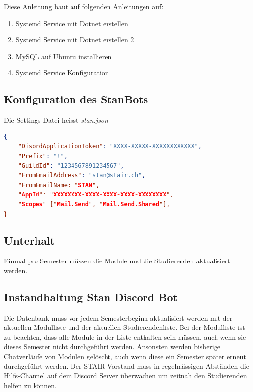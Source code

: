 \documentclass[a4paper, table]{article}
\begin{document}
Diese Anleitung baut auf folgenden Anleitungen auf:
\begin{enumerate}
    \item \href{https://devblogs.microsoft.com/dotnet/net-core-and-systemd/}{Systemd Service mit Dotnet erstellen}
    \item \href{https://blog.maartenballiauw.be/post/2021/05/25/running-a-net-application-as-a-service-on-linux-with-systemd.html}{Systemd Service mit Dotnet erstellen 2}
    \item \href{https://www.digitalocean.com/community/tutorials/how-to-install-mysql-on-ubuntu-20-04}{MySQL auf Ubuntu installieren}
    \item \href{https://askubuntu.com/questions/1004853/systemd-is-hanging-when-i-start-or-restart-a-service}{Systemd Service Konfiguration}
\end{enumerate}

\subsection{Konfiguration des StanBots}\label{konfigurationStanBot}

Die Settings Datei heisst \textit{stan.json}
\begin{lstlisting}[language=json]
{
    "DisordApplicationToken": "XXXX-XXXXX-XXXXXXXXXXXX",
    "Prefix": "!",
    "GuildId": "1234567891234567",
    "FromEmailAddress": "stan@stair.ch",
    "FromEmailName: "STAN",
    "AppId": "XXXXXXXX-XXXX-XXXX-XXXX-XXXXXXXX",
    "Scopes" ["Mail.Send", "Mail.Send.Shared"],
}
\end{lstlisting}

\subsection{Unterhalt}

Einmal pro Semester müssen die Module und die Studierenden aktualisiert werden.

\subsection{Instandhaltung Stan Discord Bot}

Die Datenbank muss vor jedem Semesterbeginn aktualisiert werden mit der aktuellen Modulliste und der aktuellen Studierendenliste.
Bei der Modulliste ist zu beachten, dass alle Module in der Liste enthalten sein müssen, auch wenn sie dieses Semester nicht durchgeführt werden.
Ansonsten werden bisherige Chatverläufe von Modulen gelöscht, auch wenn diese ein Semester später erneut durchgeführt werden.
Der STAIR Vorstand muss in regelmässigen Abständen die Hilfs-Channel auf dem Discord Server überwachen um zeitnah den Studierenden helfen zu können.
\end{document}

